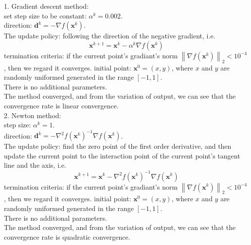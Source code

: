 \documentclass[10pt]{article}
\newcommand{\norm}[2]{\left\| #1 \right\|_{#2}}
\begin{document}
1. Gradient descent method:\\
set step size to be constant: $\alpha^k=0.002$.\\
direction: $\pmb d^k=-\nabla f(\pmb x^k)$.\\
The update policy: following the direction of the negative gradient, i.e.
$$\pmb x^{k+1}=\pmb x^k-\alpha^k\nabla f(\pmb x^k)$$
termination criteria: if the current point's gradiant's norm $\norm{\nabla f(\pmb x^k)}{2}<10^{-4}$, then we regard it converges.
initial point: $\pmb x^0=(x,y)$, where $x$ and $y$ are randomly uniformed generated in the range $[-1,1]$.\\
There is no additional parameters.\\
The method converged, and from the variation of output, we can see that the convergence rate is linear convergence.\\

2. Newton method:\\
step size: $\alpha^k=1$.\\
direction: $\pmb d^k = -\nabla^2 f(\pmb x^k)^{-1}\nabla f(\pmb x^k)$.\\
The update policy: find the zero point of the first order derivative, and then update the current point to the interaction point of the current point's tangent line and the axis, i.e.
$$\pmb x^{k+1}=\pmb x^k-\nabla^2 f(\pmb x^k)^{-1}\nabla f(\pmb x^k)$$
termination criteria: if the current point's gradiant's norm $\norm{\nabla f(\pmb x^k)}{2}<10^{-4}$, then we regard it converges.
initial point: $\pmb x^0=(x,y)$, where $x$ and $y$ are randomly uniformed generated in the range $[-1,1]$.\\
There is no additional parameters.\\
The method converged, and from the variation of output, we can see that the convergence rate is quadratic convergence.\\
\end{document}
